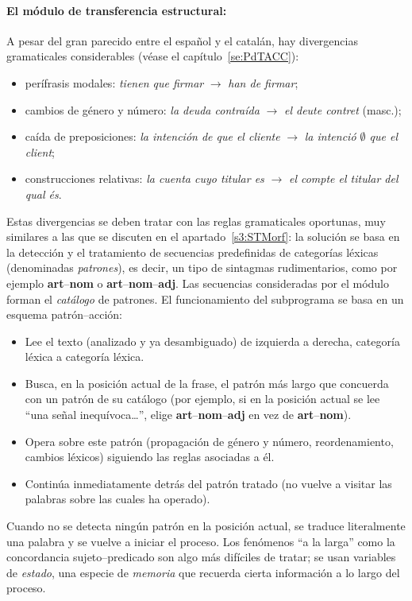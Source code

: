 \paragraph{El módulo de transferencia estructural:} A pesar del gran parecido entre el español y el catalán, hay divergencias gramaticales considerables (véase el capítulo~\ref{se:PdTACC}): \begin{itemize} \item perífrasis modales: \emph{tienen que firmar} $\rightarrow$ \emph{han de firmar}; \item cambios de género y número: \emph{la deuda contraída} $\rightarrow$ \emph{el deute contret} (masc.); \item caída de preposiciones: \emph{la intención de que el cliente} $\rightarrow$ \emph{la intenció $\emptyset$ que el client}; \item construcciones relativas: \emph{la cuenta cuyo titular es} $\rightarrow$ \emph{el compte el titular del qual és}. \end{itemize} Estas divergencias se deben tratar con las reglas gramaticales oportunas, muy similares a las que se discuten en el apartado~\ref{s3:STMorf}: la solución se basa en la detección y el tratamiento de secuencias predefinidas de categorías léxicas (denominadas \emph{patrones}), es decir, un tipo de sintagmas rudimentarios, como por ejemplo {\bf art}--{\bf nom} o {\bf art}--{\bf nom}--{\bf adj}. Las secuencias consideradas por el módulo  forman el \emph{catálogo} de patrones. El funcionamiento del subprograma se basa en un esquema patrón--acción: \begin{itemize} \item Lee el texto (analizado y ya desambiguado) de izquierda a derecha, categoría léxica a categoría léxica. \item Busca, en la posición actual de la frase, el patrón más largo que concuerda con un patrón de su catálogo (por ejemplo, si en la posición actual se lee ``una señal inequívoca\ldots'', elige {\bf art}--{\bf nom}--{\bf adj} en vez de {\bf art}--{\bf nom}). \item Opera sobre este patrón (propagación de género y número, reordenamiento, cambios léxicos) siguiendo las reglas asociadas a él. \item Continúa inmediatamente detrás del patrón tratado (no vuelve a visitar las palabras sobre las cuales ha operado). \end{itemize} Cuando no se detecta ningún patrón en la posición actual, se traduce literalmente una palabra y se vuelve a iniciar el proceso. Los fenómenos ``a la larga'' como la concordancia sujeto--predicado son algo más difíciles de tratar; se usan variables de \emph{estado}, una especie de \emph{memoria } que recuerda cierta información a lo largo del proceso. 

